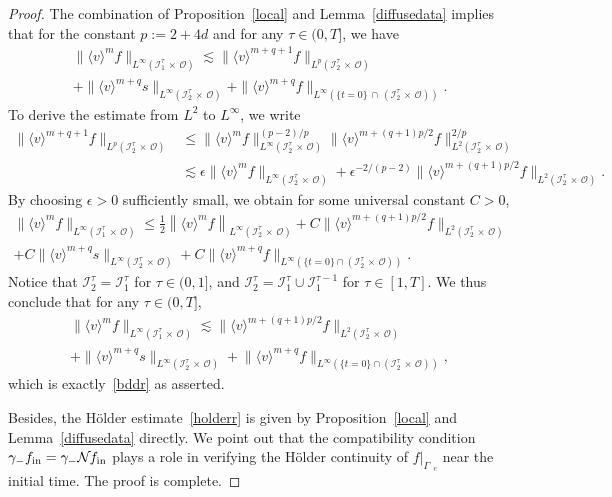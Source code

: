 \documentclass[10pt]{amsart}
\theoremstyle{definition}\newtheorem{defi}[theo]{Definition}\newtheorem{rema}[theo]{Remark}\newtheorem{exam}[theo]{Example}\newtheorem{exem}[theo]{Example}\newtheorem{nota}[theo]{Notation}
\newcommand*\fin {f_{\rm in}}
\newcommand*\I {\mathcal{I}}
\newcommand*\NN {{\mathcal{N}\hspace{-.3mm}}}
\newcommand*\Ge {\Gamma_{\;\!\!\;\!\!e}}
\newcommand*\OO {\mathcal{O}}
\newcommand{\lv}{\langle v\rangle}
\begin{document}
\begin{proof}
The combination of Proposition~\ref{local} and Lemma~\ref{diffusedata} implies that for the constant $p:=2+4d$ and for any $\tau\in(0,T]$, we have
\begin{multline*}
\big\|\lv^{m}f\big\|_{L^\infty\left(\I_1^\tau\,\times\,\OO\right)}
\lesssim \big\|\lv^{m+q+1} f\big\|_{L^p\left(\I_2^\tau\,\times\,\OO\right)}\\
+ \|\lv^{m+q}s\|_{L^\infty\left(\I_2^\tau\,\times\,\OO\right)} + \|\lv^{m+q}f\|_{L^\infty\left(\{t=0\}\,\cap\,\left(\I_2^\tau\,\times\,\OO\right)\right)}.
\end{multline*}
To derive the estimate from $L^2$ to $L^\infty$, we write
\begin{align*}
\big\|\lv^{m+q+1} f\big\|_{L^p\left(\I_2^\tau\,\times\,\OO\right)}
&\le \big\|\lv^{m}f\big\|_{L^\infty\left(\I_2^\tau\,\times\,\OO\right)}^{(p-2)/p}
\big\|\lv^{m+(q+1)p/2}f\big\|_{L^2\left(\I_2^\tau\,\times\,\OO\right)}^{2/p} \\
&\lesssim \epsilon\|\lv^mf\|_{L^\infty\left(\I_2^\tau\,\times\,\OO\right)} + \epsilon^{-2/(p-2)} \big\|\lv^{m+(q+1)p/2}f\big\|_{L^2\left(\I_2^\tau\,\times\,\OO\right)}.
\end{align*}
By choosing $\epsilon>0$ sufficiently small, we obtain for some universal constant $C>0$,
\begin{multline*}
\big\|\lv^mf\big\|_{L^\infty\left(\I_1^\tau\,\times\,\OO\right)}
\le \frac{1}{2}\left\|\lv^mf\right\|_{L^\infty\left(\I_2^\tau\,\times\,\OO\right)} + C\big\|\lv^{m+(q+1)p/2}f\big\|_{L^2\left(\I_2^\tau\,\times\,\OO\right)}\\
+ C\big\|\lv^{m+q}s\big\|_{L^\infty\left(\I_2^\tau\,\times\,\OO\right)} + C\big\|\lv^{m+q}f\big\|_{L^\infty\left(\{t=0\}\cap\left(\I_2^\tau\,\times\,\OO\right)\right)} .
\end{multline*}
Notice that $\I_2^\tau=\I_1^\tau$ for $\tau\in(0,1]$, and $\I_2^\tau=\I_1^\tau\cup\I_1^{\tau-1}$ for $\tau\in[1,T]$. We thus conclude that for any $\tau\in(0,T]$,
\begin{multline*}
\big\|\lv^mf\big\|_{L^\infty\left(\I_1^\tau\,\times\,\OO\right)}
\lesssim \big\|\lv^{m+(q+1)p/2}f\big\|_{L^2\left(\I_2^\tau\,\times\,\OO\right)}\\ 
+ \big\|\lv^{m+q}s\big\|_{L^\infty\left(\I_2^\tau\,\times\,\OO\right)} + \big\|\lv^{m+q}f\big\|_{L^\infty\left(\{t=0\}\cap\left(\I_2^\tau\,\times\,\OO\right)\right)},
\end{multline*}
which is exactly~\eqref{bddr} as asserted.

Besides, the H\"older estimate~\eqref{holderr} is given by Proposition~\ref{local} and Lemma~\ref{diffusedata} directly. We point out that the compatibility condition $\gamma_-\fin=\gamma_-\NN\fin$ plays a role in verifying the H\"older continuity of $f|_{\Ge}$ near the initial time. The proof is complete.
\end{proof}
\end{document}
